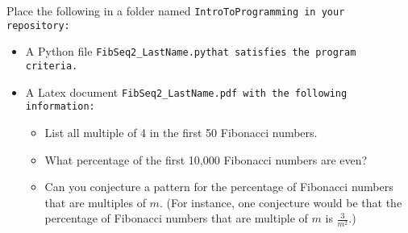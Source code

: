 \documentclass{article}
\newcommand\foldername{\tt{IntroToProgramming} }
\newcommand\filename{\tt{FibSeq2\_LastName.py}\;\;}
\begin{document}
	Place the following in a folder named \foldername in your repository:
	\begin{itemize}
		\item A Python file \filename  that satisfies the program criteria.
		\item A Latex document \tt{FibSeq2\_LastName.pdf} with the following information:
		\begin{itemize}
			\item List all multiple of 4 in the first 50 Fibonacci numbers.
			\item What percentage of the first 10,000 Fibonacci numbers are even?
			\item Can you conjecture a pattern for the percentage of Fibonacci numbers that are multiples of $m$.  (For instance, one conjecture would be that the percentage of Fibonacci numbers that are multiple of $m$ is $\frac{3}{m^2}$.)
		\end{itemize}
	\end{itemize}

	
\end{document}
